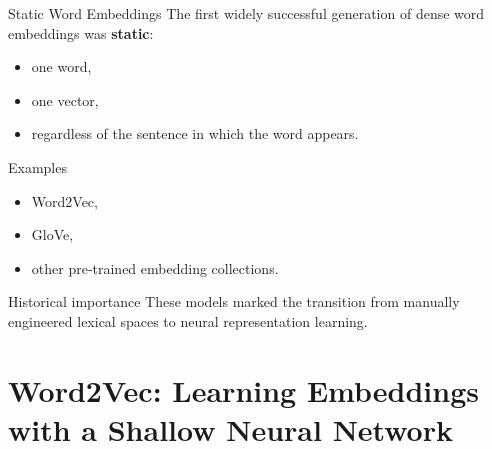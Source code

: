 \documentclass[11pt,aspectratio=169,professionalfonts]{beamer}
\begin{document}
%
%
\begin{frame}{Static Word Embeddings}
The first widely successful generation of dense word embeddings was \textbf{static}:
\begin{itemize}
    \item one word,
    \item one vector,
    \item regardless of the sentence in which the word appears.
\end{itemize}

\vspace{0.2cm}
\begin{block}{Examples}
\begin{itemize}
    \item Word2Vec,
    \item GloVe,
    \item other pre-trained embedding collections.
\end{itemize}
\end{block}

\vspace{0.15cm}
\begin{alertblock}{Historical importance}
These models marked the transition from manually engineered lexical spaces to neural representation learning.
\end{alertblock}
\end{frame}
%
\section{Word2Vec: Learning Embeddings with a Shallow Neural Network}
%
\end{document}
